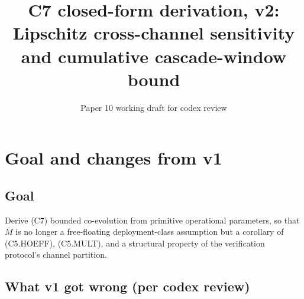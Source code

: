 \documentclass{article}
\title{C7 closed-form derivation, v2: \\
Lipschitz cross-channel sensitivity and cumulative cascade-window bound}
\author{Paper 10 working draft for codex review}
\date{}
\begin{document}
\maketitle

\section{Goal and changes from v1}

\subsection{Goal}

Derive (C7) bounded co-evolution from primitive operational
parameters, so that $\bar{M}$ is no longer a free-floating
deployment-class assumption but a corollary of (C5.HOEFF),
(C5.MULT), and a structural property of the verification
protocol's channel partition.

\subsection{What v1 got wrong (per codex review)}
\end{document}
